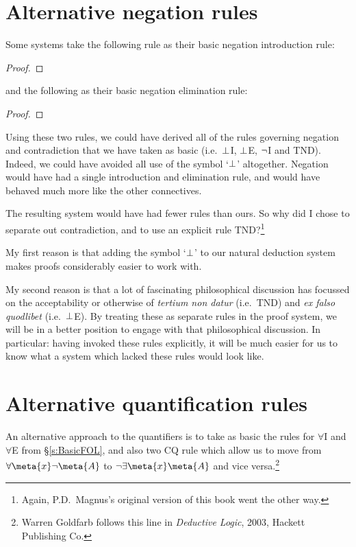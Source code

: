 \section{Alternative negation rules}
Some systems take the following rule as their basic negation introduction rule:
\begin{proof}
	\open
	\close
\end{proof}
and the following as their basic negation elimination rule:
\begin{proof}
	\open
	\close
\end{proof}
Using these two rules, we could have derived all of the rules governing negation and contradiction that we have taken as basic (i.e.\ $\bot$I, $\bot$E, $\neg$I and TND). Indeed, we could have avoided all use of the symbol `$\bot$' altogether. Negation would have had a single introduction and elimination rule, and would have behaved much more like the other connectives.

The resulting system would have had fewer rules than ours. So why did I chose to separate out contradiction, and to use an explicit rule TND?\footnote{Again, P.D.\ Magnus's original version of this book went the other way.}

My first reason is that adding the symbol `$\bot$' to our natural deduction system makes proofs considerably easier to work with.

My second reason is that a lot of fascinating philosophical discussion has focussed on the acceptability or otherwise of \emph{tertium non datur} (i.e.\ TND) and \emph{ex falso quodlibet} (i.e.\ $\bot$E). By treating these as separate rules in the proof system, we will be  in a better position to engage with that philosophical discussion. In particular: having invoked these rules explicitly, it will be much easier for us to know what a system which lacked these rules would look like.



\section{Alternative quantification rules}
An alternative approach to the quantifiers is to take as basic the rules for $\forall$I and $\forall$E from \S\ref{s:BasicFOL}, and also two CQ rule which allow us to move from $\forall \meta{x} \enot \meta{A}$ to $\enot \exists \meta{x} \meta{A}$ and vice versa.\footnote{Warren Goldfarb follows this line in \emph{Deductive Logic}, 2003, Hackett Publishing Co.}  

